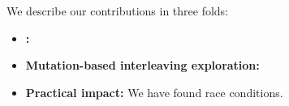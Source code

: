 We describe our contributions in three folds:

\begin{itemize}
\item \textbf{\Intcov:}
\item \textbf{Mutation-based interleaving exploration:}
\item \textbf{Practical impact:}
  We have found \totalbugs race conditions.
\end{itemize}

